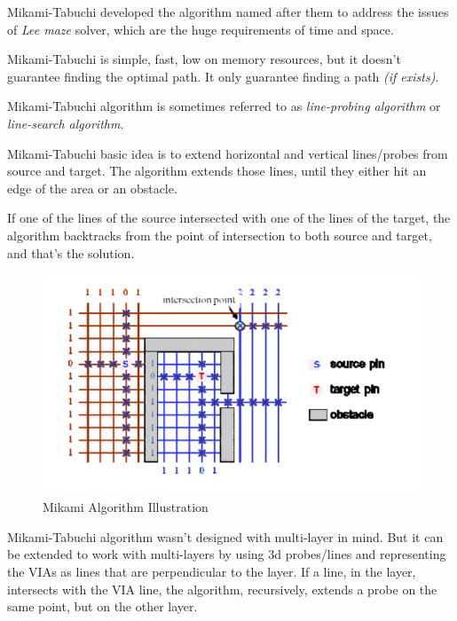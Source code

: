 Mikami-Tabuchi developed the algorithm named after them \cite{mikami1968computer} to address the issues of \emph{Lee maze} solver, which are the huge requirements of time and space.

Mikami-Tabuchi is simple, fast, low on memory resources, but it doesn't guarantee finding the optimal path. It only guarantee finding a path \emph{(if exists)}.

Mikami-Tabuchi algorithm is sometimes referred to as \textit{line-probing algorithm} or \textit{line-search algorithm}.

Mikami-Tabuchi basic idea is to extend horizontal and vertical lines/probes from source and target. The algorithm extends those lines, until they either hit an edge of the area or an obstacle.

If one of the lines of the source intersected with one of the lines of the target, the algorithm backtracks from the point of intersection to both source and target, and that's the solution.

\begin{figure}
    \centering
    \includegraphics[width=\linewidth]{figures/mikami.png}
    \caption{Mikami Algorithm Illustration \cite{chen2009global}}
    \label{fig:mikamiIllustr}
\end{figure}

Mikami-Tabuchi algorithm wasn't designed with multi-layer in mind. But it can be extended to work with multi-layers by using 3d probes/lines and representing the VIAs as lines that are perpendicular to the layer. If a line, in the layer, intersects with the VIA line, the algorithm, recursively, extends a probe on the same point, but on the other layer.

